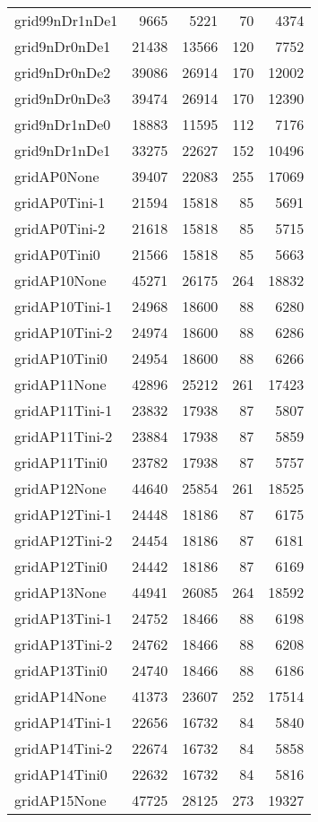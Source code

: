 \begin{longtable}{lrrrr}
grid99nDr1nDe1 & 9665 & 5221 & 70 & 4374 \\
grid9nDr0nDe1 & 21438 & 13566 & 120 & 7752 \\
grid9nDr0nDe2 & 39086 & 26914 & 170 & 12002 \\
grid9nDr0nDe3 & 39474 & 26914 & 170 & 12390 \\
grid9nDr1nDe0 & 18883 & 11595 & 112 & 7176 \\
grid9nDr1nDe1 & 33275 & 22627 & 152 & 10496 \\
gridAP0None & 39407 & 22083 & 255 & 17069 \\
gridAP0Tini-1 & 21594 & 15818 & 85 & 5691 \\
gridAP0Tini-2 & 21618 & 15818 & 85 & 5715 \\
gridAP0Tini0 & 21566 & 15818 & 85 & 5663 \\
gridAP10None & 45271 & 26175 & 264 & 18832 \\
gridAP10Tini-1 & 24968 & 18600 & 88 & 6280 \\
gridAP10Tini-2 & 24974 & 18600 & 88 & 6286 \\
gridAP10Tini0 & 24954 & 18600 & 88 & 6266 \\
gridAP11None & 42896 & 25212 & 261 & 17423 \\
gridAP11Tini-1 & 23832 & 17938 & 87 & 5807 \\
gridAP11Tini-2 & 23884 & 17938 & 87 & 5859 \\
gridAP11Tini0 & 23782 & 17938 & 87 & 5757 \\
gridAP12None & 44640 & 25854 & 261 & 18525 \\
gridAP12Tini-1 & 24448 & 18186 & 87 & 6175 \\
gridAP12Tini-2 & 24454 & 18186 & 87 & 6181 \\
gridAP12Tini0 & 24442 & 18186 & 87 & 6169 \\
gridAP13None & 44941 & 26085 & 264 & 18592 \\
gridAP13Tini-1 & 24752 & 18466 & 88 & 6198 \\
gridAP13Tini-2 & 24762 & 18466 & 88 & 6208 \\
gridAP13Tini0 & 24740 & 18466 & 88 & 6186 \\
gridAP14None & 41373 & 23607 & 252 & 17514 \\
gridAP14Tini-1 & 22656 & 16732 & 84 & 5840 \\
gridAP14Tini-2 & 22674 & 16732 & 84 & 5858 \\
gridAP14Tini0 & 22632 & 16732 & 84 & 5816 \\
gridAP15None & 47725 & 28125 & 273 & 19327 \\

\end{longtable}
